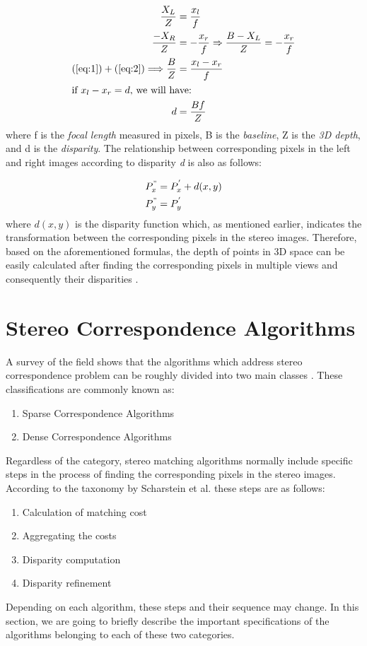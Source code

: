 \begin{align}
\frac{X_{L}}{Z} &= \frac{x_{l}}{f} \label{eq:1} \\
\frac{-X_{R}}{Z} &= -\frac{x_{r}}{f}  \Rightarrow \frac{B-X_{L}}{Z}=-\frac{x_{r}}{f} \label{eq:2} \\
(\ref{eq:1}) + (\ref{eq:2}) \Longrightarrow  \frac{B}{Z} &= \frac{x_{l}-x_{r}}{f} \label{eq:3} \\
\intertext{if $x_{l}-x_{r}=d$, we will have:}
d &= \frac{Bf}{Z} \label{eq:dispeq}
\end{align}
where f is the {\it focal length} measured in pixels, B is the {\it baseline}, Z is the {\it 3D depth}, and d is the {\it disparity}. The relationship between corresponding pixels in the left
and right images according to disparity {\it d} is also as follows:

\begin{align}
{P}^{"}_{x} &= {P}^{'}_{x}+d(x,y) \\
{P}^{"}_{y} &= {P}^{'}_{y}
\end{align}
where $d(x,y)$ is the disparity function which, as mentioned earlier, indicates the transformation between the corresponding pixels in the stereo images. Therefore, based on the aforementioned formulas, the depth of points in 3D space can be easily calculated after finding the corresponding pixels in multiple views and consequently their
disparities \cite{bol87,oku93,sch02}.

\section{Stereo Correspondence Algorithms}
A survey of the field shows that the algorithms which address stereo correspondence problem can be roughly divided into two main classes \cite{sch02}. These classifications are commonly known as:
\begin{enumerate}
\item Sparse Correspondence Algorithms
\item Dense Correspondence Algorithms 
\end{enumerate}

Regardless of the category, stereo matching algorithms normally include specific steps in the process of finding the corresponding pixels in the stereo images.
According to the taxonomy by Scharstein et al. these steps are as follows:

\begin{enumerate}
\item {Calculation of matching cost}
\item {Aggregating the costs}
\item {Disparity computation}
\item {Disparity refinement}
\end{enumerate}
Depending on each algorithm, these steps and their sequence may change.\newline
In this section, we are going to briefly describe the important specifications of the algorithms belonging to each of these two categories.
